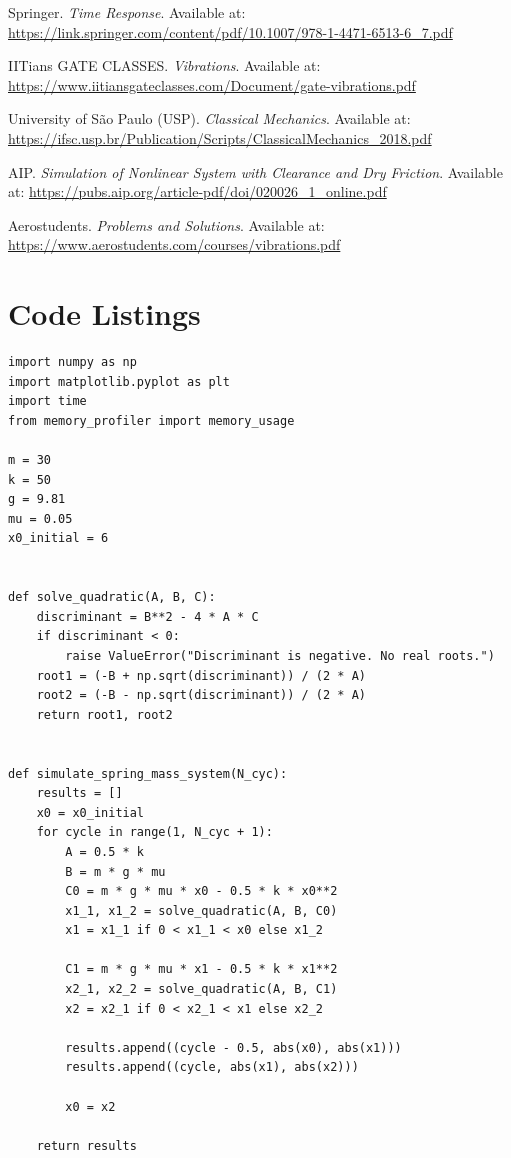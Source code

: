\documentclass[12pt, a4paper, oneside]{report}
\begin{document}
\begin{thebibliography}{99}
	Springer. \textit{Time Response}. Available at: \url{https://link.springer.com/content/pdf/10.1007/978-1-4471-6513-6_7.pdf}

	IITians GATE CLASSES. \textit{Vibrations}. Available at: \url{https://www.iitiansgateclasses.com/Document/gate-vibrations.pdf}

	University of São Paulo (USP). \textit{Classical Mechanics}. Available at: \url{https://ifsc.usp.br/Publication/Scripts/ClassicalMechanics_2018.pdf}

	AIP. \textit{Simulation of Nonlinear System with Clearance and Dry Friction}. Available at: \url{https://pubs.aip.org/article-pdf/doi/020026_1_online.pdf}

	Aerostudents. \textit{Problems and Solutions}. Available at: \url{https://www.aerostudents.com/courses/vibrations.pdf}



\end{thebibliography}


\appendix
\chapter{Code Listings}
\begin{lstlisting}
import numpy as np
import matplotlib.pyplot as plt
import time
from memory_profiler import memory_usage

m = 30
k = 50
g = 9.81
mu = 0.05
x0_initial = 6


def solve_quadratic(A, B, C):
    discriminant = B**2 - 4 * A * C
    if discriminant < 0:
        raise ValueError("Discriminant is negative. No real roots.")
    root1 = (-B + np.sqrt(discriminant)) / (2 * A)
    root2 = (-B - np.sqrt(discriminant)) / (2 * A)
    return root1, root2


def simulate_spring_mass_system(N_cyc):
    results = []
    x0 = x0_initial
    for cycle in range(1, N_cyc + 1):
        A = 0.5 * k
        B = m * g * mu
        C0 = m * g * mu * x0 - 0.5 * k * x0**2
        x1_1, x1_2 = solve_quadratic(A, B, C0)
        x1 = x1_1 if 0 < x1_1 < x0 else x1_2

        C1 = m * g * mu * x1 - 0.5 * k * x1**2
        x2_1, x2_2 = solve_quadratic(A, B, C1)
        x2 = x2_1 if 0 < x2_1 < x1 else x2_2

        results.append((cycle - 0.5, abs(x0), abs(x1)))
        results.append((cycle, abs(x1), abs(x2)))

        x0 = x2

    return results
\end{lstlisting}
\end{document}
